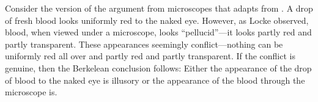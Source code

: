 \documentclass[12pt]{article}
\begin{document}

Consider the version of the argument from microscopes that \citet{Hilbert:1987jq} adapts from \citet{Marc-Wogau:1968kx}. A drop of fresh blood looks uniformly red to the naked eye. However, as Locke observed, blood, when viewed under a microscope, looks ``pellucid''---it looks partly red and partly transparent. These appearances seemingly conflict---nothing can be uniformly red all over and partly red and partly transparent. If the conflict is genuine, then the Berkelean conclusion follows: Either the appearance of the drop of blood to the naked eye is illusory or the appearance of the blood through the microscope is. 
\end{document}

